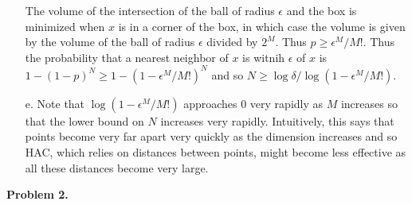 \documentclass[12pt]{amsart}
\theoremstyle{remark}
\begin{document}
\begin{enumerate}
The volume of the intersection of the ball of radius $\epsilon$ and the box is minimized when $x$ is in a corner of the box, in which case the volume is given by the volume of the ball of radius $\epsilon$ divided by $2^M$. Thus $p \ge \epsilon^M/M!$. Thus the probability that a nearest neighbor of $x$ is witnih $\epsilon$ of $x$ is $1-(1-p)^N\ge 1-(1-\epsilon^M/M!)^N$ and so $N\ge \log \delta/\log(1-\epsilon^M/M!)$.

\item[e.]
Note that $\log(1-\epsilon^M/M!)$ approaches 0 very rapidly as $M$ increases so that the lower bound on $N$ increases very rapidly. Intuitively, this says that points become very far apart very quickly as the dimension increases and so HAC, which relies on distances between points, might become less effective as all these distances become very large.

\end{enumerate}
\noindent \textbf{Problem 2.}
\end{document}
